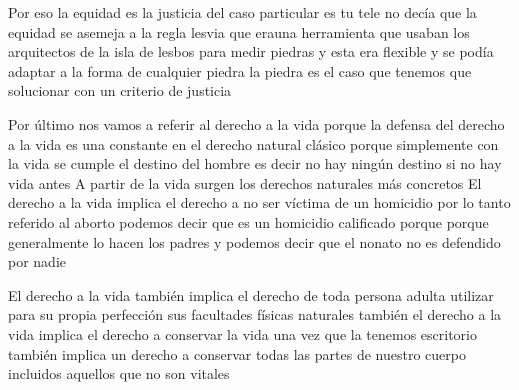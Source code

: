 \documentclass[12pt]{book}
\begin{document}
Por eso la equidad es la justicia del caso particular es tu tele no decía que la equidad se asemeja a la regla lesvia que erauna herramienta que usaban los arquitectos de la isla de lesbos para medir piedras y esta era flexible y se podía adaptar a la forma de cualquier piedra la piedra es el caso que tenemos que solucionar con un criterio de justicia



Por último nos vamos a referir al derecho a la vida
porque la defensa del derecho a la vida es una constante en el derecho natural clásico porque simplemente con la vida se cumple el destino del hombre es decir no hay ningún destino si no hay vida antes
A partir de la vida surgen los derechos naturales más concretos
El derecho a la vida implica el derecho a no ser víctima de un homicidio por lo tanto referido al aborto podemos decir que es un homicidio calificado porque porque generalmente lo hacen los padres y podemos decir que el nonato no es defendido por nadie

El derecho a la vida también implica el derecho de toda persona adulta utilizar para su propia perfección sus facultades físicas naturales
también el derecho a la vida implica el derecho a conservar la vida una vez que la tenemos
escritorio también implica un derecho a conservar todas las partes de nuestro cuerpo incluidos aquellos que no son vitales
\end{document}

